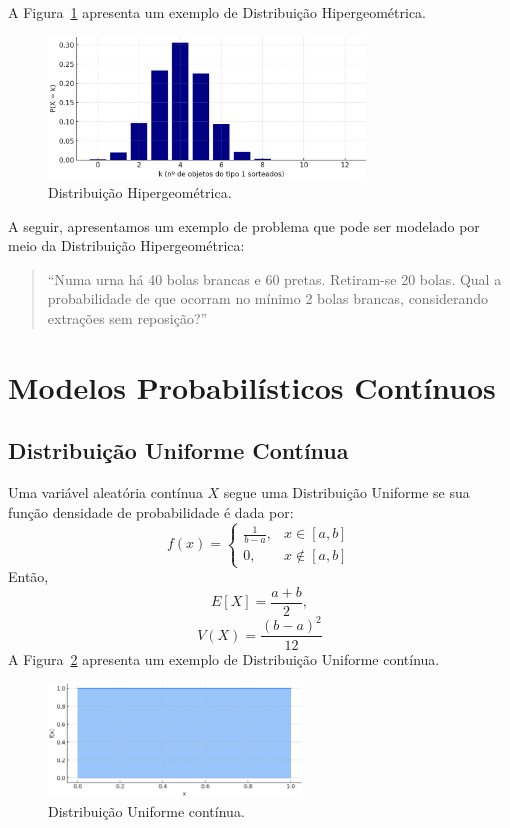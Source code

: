 \documentclass{article}
\begin{document}
A Figura~\ref{fig:dist_disc_hipergeometrica} apresenta um exemplo de Distribuição Hipergeométrica.

\begin{figure}[H]
    \centering
    \includegraphics[width=0.75\textwidth]{figuras/dist_disc_hipergeometrica.png}
    \caption{Distribuição Hipergeométrica.}
    \label{fig:dist_disc_hipergeometrica}
\end{figure}

A seguir, apresentamos um exemplo de problema que pode ser modelado por meio da Distribuição Hipergeométrica:
\begin{quote}
``Numa urna há 40 bolas brancas e 60 pretas. Retiram-se 20 bolas. Qual a probabilidade de que ocorram no mínimo 2 bolas brancas, considerando extrações sem reposição?''
\end{quote}

\section{Modelos Probabilísticos Contínuos}

\subsection{Distribuição Uniforme Contínua}
Uma variável aleatória contínua $X$ segue uma Distribuição Uniforme se sua função densidade de probabilidade é dada por:
    $$
    f(x) = \begin{cases}
    \frac{1}{b - a}, & x \in [a, b] \\
    0, & x \notin [a, b]
    \end{cases}
    $$
Então,
    $$
    E[X] = \frac{a + b}{2},
    $$
    $$
    V(X) = \frac{(b - a)^2}{12}
    $$
A Figura~\ref{fig:dist_cont_uniforme} apresenta um exemplo de Distribuição Uniforme contínua.

\begin{figure}[H]
    \centering
    \includegraphics[width=0.6\textwidth]{figuras/dist_cont_uniforme.png}
    \caption{Distribuição Uniforme contínua.}
    \label{fig:dist_cont_uniforme}
\end{figure}
\end{document}
